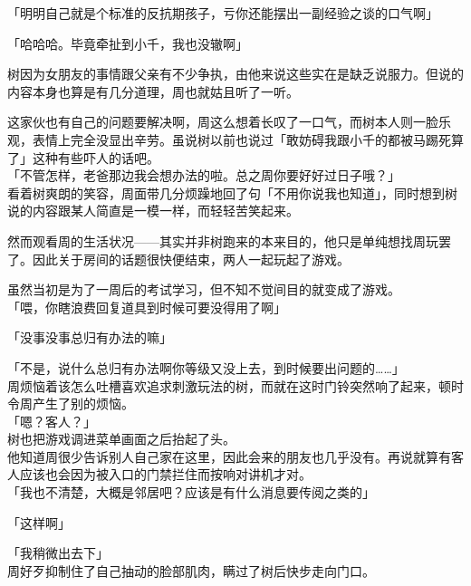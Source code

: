 「明明自己就是个标准的反抗期孩子，亏你还能摆出一副经验之谈的口气啊」

「哈哈哈。毕竟牵扯到小千，我也没辙啊」

树因为女朋友的事情跟父亲有不少争执，由他来说这些实在是缺乏说服力。但说的内容本身也算是有几分道理，周也就姑且听了一听。

这家伙也有自己的问题要解决啊，周这么想着长叹了一口气，而树本人则一脸乐观，表情上完全没显出辛劳。虽说树以前也说过「敢妨碍我跟小千的都被马踢死算了」这种有些吓人的话吧。\\

「不管怎样，老爸那边我会想办法的啦。总之周你要好好过日子哦？」\\

看着树爽朗的笑容，周面带几分烦躁地回了句「不用你说我也知道」，同时想到树说的内容跟某人简直是一模一样，而轻轻苦笑起来。\\

\vspace{2\baselineskip}

然而观看周的生活状况——其实并非树跑来的本来目的，他只是单纯想找周玩罢了。因此关于房间的话题很快便结束，两人一起玩起了游戏。

虽然当初是为了一周后的考试学习，但不知不觉间目的就变成了游戏。\\

「喂，你瞎浪费回复道具到时候可要没得用了啊」

「没事没事总归有办法的嘛」

「不是，说什么总归有办法啊你等级又没上去，到时候要出问题的……」\\

周烦恼着该怎么吐槽喜欢追求刺激玩法的树，而就在这时门铃突然响了起来，顿时令周产生了别的烦恼。\\

「嗯？客人？」\\

树也把游戏调进菜单画面之后抬起了头。\\

他知道周很少告诉别人自己家在这里，因此会来的朋友也几乎没有。再说就算有客人应该也会因为被入口的门禁拦住而按响对讲机才对。\\

「我也不清楚，大概是邻居吧？应该是有什么消息要传阅之类的」

「这样啊」

「我稍微出去下」\\

周好歹抑制住了自己抽动的脸部肌肉，瞒过了树后快步走向门口。\\

